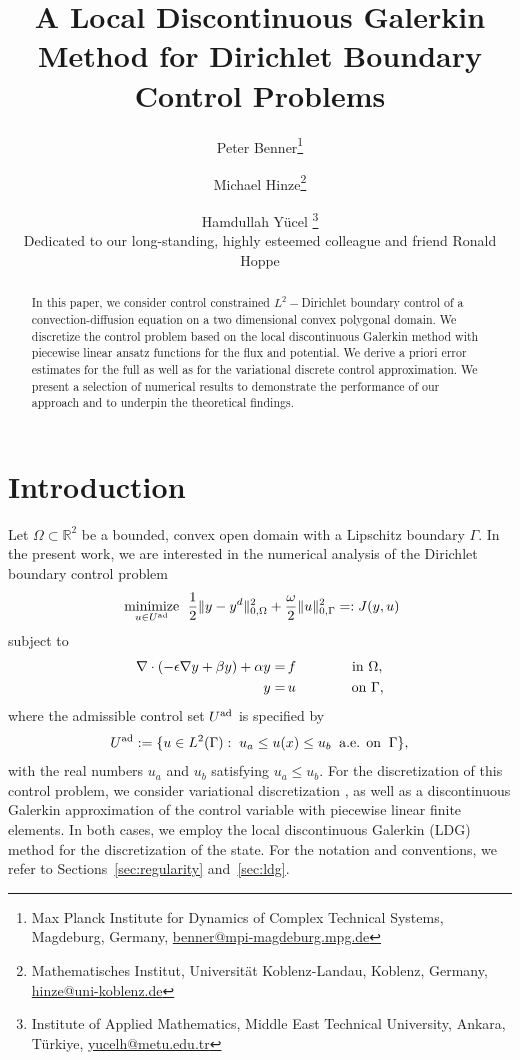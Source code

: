 \documentclass[a4paper,10pt]{article}
\author{Peter Benner\footnote{Max Planck Institute for Dynamics of Complex Technical Systems, Magdeburg, Germany, \url{benner@mpi-magdeburg.mpg.de}} \and Michael Hinze\footnote{Mathematisches Institut, Universität Koblenz-Landau, Koblenz, Germany, \url{hinze@uni-koblenz.de}} \and Hamdullah Yücel \footnote{Institute of Applied Mathematics, Middle East Technical University, Ankara, Türkiye, \url{yucelh@metu.edu.tr}}\\[1cm] Dedicated to our long-standing, highly esteemed colleague and friend Ronald Hoppe}
\title{A Local Discontinuous Galerkin Method for Dirichlet Boundary Control Problems}
\newcommand{\Uad}{{U^{\textup{ad}}}}
\numberwithin{theorem}{section}
\newcommand{\x}[2][blue]{#2}
\begin{document}
\maketitle

\begin{abstract}
In this paper, we consider control constrained $L^2-$Dirichlet boundary control of a convection-diffusion equation on a two dimensional convex polygonal domain. We discretize the control problem based on the local discontinuous Galerkin method with piecewise linear ansatz functions for the flux and potential. We derive a priori error estimates for the full as well as for the variational discrete control approximation. We present a selection of numerical results to demonstrate the performance of our approach and to underpin the theoretical findings.
\end{abstract}


\section{Introduction}\label{sec:introduction}


Let $\Omega \subset \mathbb{R}^2 $ be a bounded, convex open domain with a Lipschitz boundary $\Gamma$. In the present work, we are interested in the numerical analysis of the Dirichlet boundary control problem
\begin{equation}\label{p1}
       \underset{u \in \Uad}{\hbox{ minimize }} \;  \frac{1}{2}\|y-y^d\|^{2}_{0,\Omega} + \frac{\omega}{2} \|u\|^{2}_{0,\Gamma} =: J(y,u)
\end{equation}
subject to
\begin{equation}\label{p2}
 \begin{split}
  \nabla \cdot ( - \epsilon \nabla y + \beta  y )  + \alpha y =& \, f      \qquad \qquad \hbox{in   }  \Omega,   \\
     y=& \, u    \qquad \qquad  \hbox{on   }   \Gamma, 
\end{split}
\end{equation}
where the admissible control set $\Uad$  is specified by
\begin{align}\label{p3}
\Uad := \{ u \in L^{2}(\Gamma): \;  u_{a} \leq u(x) \leq u_{b} \;\; \hbox{a.e. on} \;\; \Gamma\},
\end{align}
with the real numbers $u_a$ and $u_b$ satisfying $u_a \leq u_b$. For the  discretization of this control problem, we consider  variational discretization \cite{MHinze_2005a}, as well as  a  discontinuous Galerkin approximation of the control variable \x{with piecewise linear finite elements}. In both cases, we employ the local discontinuous Galerkin (LDG) method for the discretization of the state. \x{For the notation and conventions, we refer to Sections~\ref{sec:regularity} and~\ref{sec:ldg}}.
\end{document}

